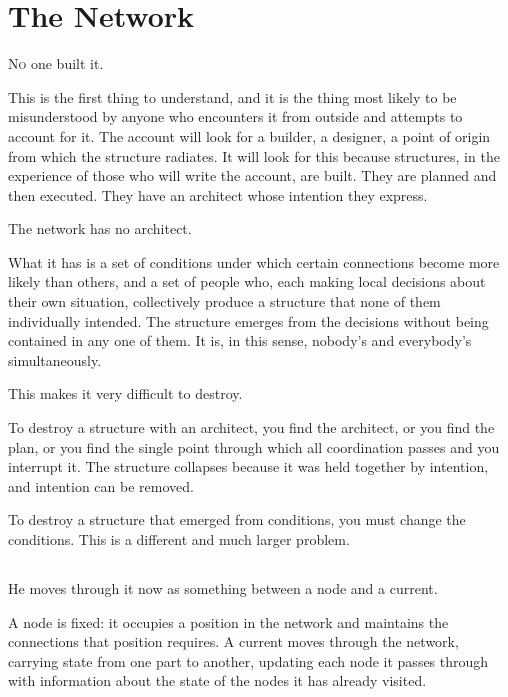 
\chapter{The Network}


\lettrine{N}{o} one built it.

This is the first thing to understand, and it is the thing most
likely to be misunderstood by anyone who encounters it from
outside and attempts to account for it. The account will look
for a builder, a designer, a point of origin from which the
structure radiates. It will look for this because structures,
in the experience of those who will write the account, are
built. They are planned and then executed. They have an
architect whose intention they express.

The network has no architect.

What it has is a set of conditions under which certain
connections become more likely than others, and a set of
people who, each making local decisions about their own
situation, collectively produce a structure that none of them
individually intended. The structure emerges from the
decisions without being contained in any one of them. It
is, in this sense, nobody's and everybody's simultaneously.

This makes it very difficult to destroy.

To destroy a structure with an architect, you find the
architect, or you find the plan, or you find the single point
through which all coordination passes and you interrupt it.
The structure collapses because it was held together by
intention, and intention can be removed.

To destroy a structure that emerged from conditions, you must
change the conditions. This is a different and much larger
problem.

\section{}

He moves through it now as something between a node and a
current.

A node is fixed: it occupies a position in the network and
maintains the connections that position requires. A current
moves through the network, carrying state from one part to
another, updating each node it passes through with information
about the state of the nodes it has already visited.

